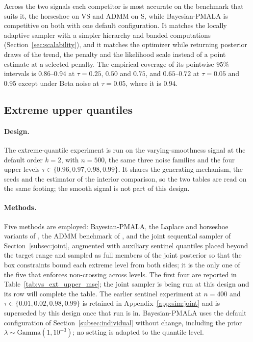 Across the two signals each competitor is most accurate on the benchmark that suits it, the horseshoe on VS and ADMM on S, while Bayesian-PMALA is competitive on both with one default configuration. It matches the locally adaptive sampler with a simpler hierarchy and banded computations (Section~\ref{sec:scalability}), and it matches the optimizer while returning posterior draws of the trend, the penalty and the likelihood scale instead of a point estimate at a selected penalty. The empirical coverage of its pointwise $95\%$ intervals is $0.86$--$0.94$ at $\tau=0.25$, $0.50$ and $0.75$, and $0.65$--$0.72$ at $\tau=0.05$ and $0.95$ except under Beta noise at $\tau=0.05$, where it is $0.94$.

\subsection{Extreme upper quantiles}
\label{sec:sim:extreme}

\paragraph{Design.} The extreme-quantile experiment is run on the varying-smoothness signal at the default order $k=2$, with $n=500$, the same three noise families and the four upper levels $\tau\in\{0.96,0.97,0.98,0.99\}$. It shares the generating mechanism, the seeds and the estimator of the interior comparison, so the two tables are read on the same footing; the smooth signal is not part of this design.

\paragraph{Methods.} Five methods are employed: Bayesian-PMALA, the Laplace and horseshoe variants of \citet{onizuka2024fast}, the ADMM benchmark of \citet{brantley2020baseline}, and the joint sequential sampler of Section~\ref{subsec:joint}, augmented with auxiliary sentinel quantiles placed beyond the target range and sampled as full members of the joint posterior so that the box constraints bound each extreme level from both sides; it is the only one of the five that enforces non-crossing across levels. The first four are reported in Table~\ref{tab:vs_ext_upper_mse}; the joint sampler is being run at this design and its row will complete the table. The earlier sentinel experiment at $n=400$ and $\tau\in\{0.01,0.02,0.98,0.99\}$ is retained in Appendix~\ref{app:sim:joint} and is superseded by this design once that run is in. Bayesian-PMALA uses the default configuration of Section~\ref{subsec:individual} without change, including the prior $\lambda\sim\mathrm{Gamma}(1,10^{-3})$; no setting is adapted to the quantile level.

